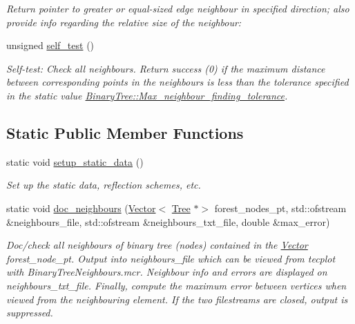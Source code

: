 \begin{DoxyCompactItemize}
\begin{DoxyCompactList}\small\item\em Return pointer to greater or equal-\/sized edge neighbour in specified {\ttfamily direction}; also provide info regarding the relative size of the neighbour\+: \end{DoxyCompactList}\item 
unsigned \hyperlink{classoomph_1_1BinaryTree_ac8052fae786bd4aad0a7334d04b59328}{self\+\_\+test} ()
\begin{DoxyCompactList}\small\item\em Self-\/test\+: Check all neighbours. Return success (0) if the maximum distance between corresponding points in the neighbours is less than the tolerance specified in the static value \hyperlink{classoomph_1_1Tree_aef9abebc166fa3bf81ecb59ec0d5d6b2}{Binary\+Tree\+::\+Max\+\_\+neighbour\+\_\+finding\+\_\+tolerance}. \end{DoxyCompactList}\end{DoxyCompactItemize}
\subsection*{Static Public Member Functions}
\begin{DoxyCompactItemize}
\item 
static void \hyperlink{classoomph_1_1BinaryTree_a46528d3d7749ee316f193f28b5abd8fb}{setup\+\_\+static\+\_\+data} ()
\begin{DoxyCompactList}\small\item\em Set up the static data, reflection schemes, etc. \end{DoxyCompactList}\item 
static void \hyperlink{classoomph_1_1BinaryTree_a2f8250c7ab624c28a1f64c89f9b4b2af}{doc\+\_\+neighbours} (\hyperlink{classoomph_1_1Vector}{Vector}$<$ \hyperlink{classoomph_1_1Tree}{Tree} $\ast$$>$ forest\+\_\+nodes\+\_\+pt, std\+::ofstream \&neighbours\+\_\+file, std\+::ofstream \&neighbours\+\_\+txt\+\_\+file, double \&max\+\_\+error)
\begin{DoxyCompactList}\small\item\em Doc/check all neighbours of binary tree (nodes) contained in the \hyperlink{classoomph_1_1Vector}{Vector} forest\+\_\+node\+\_\+pt. Output into neighbours\+\_\+file which can be viewed from tecplot with Binary\+Tree\+Neighbours.\+mcr. Neighbour info and errors are displayed on neighbours\+\_\+txt\+\_\+file. Finally, compute the maximum error between vertices when viewed from the neighbouring element. If the two filestreams are closed, output is suppressed. \end{DoxyCompactList}\end{DoxyCompactItemize}
